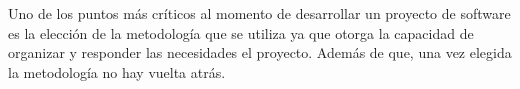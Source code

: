 Uno de los puntos más críticos al momento de desarrollar un proyecto de software es la elección de la metodología que se utiliza ya que otorga la capacidad de organizar y responder las necesidades el proyecto. Además de que, una vez elegida la metodología no hay vuelta atrás.